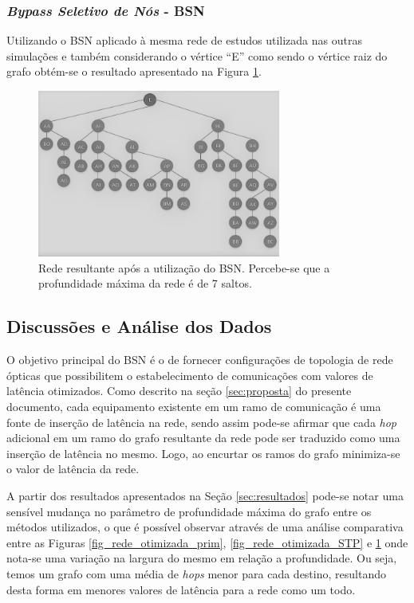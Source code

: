 \documentclass[12pt]{article}
\begin{document}
\subsubsection{\emph{Bypass Seletivo de Nós} - BSN}
Utilizando o BSN aplicado à mesma rede de estudos utilizada nas outras simulações e também considerando o vértice ``E'' como sendo o vértice raiz do grafo obtém-se o resultado apresentado na Figura \ref{fig_rede_otimizada_BSN}.

\begin{figure} %
	\centering
	\includegraphics[width=8cm]{Otimizada_BSN_PB}
	\caption{Rede resultante após a utilização do BSN. Percebe-se que a profundidade máxima da rede é de 7 saltos.}
	\label{fig_rede_otimizada_BSN}
\end{figure}



\subsection{Discussões e Análise dos Dados}

O objetivo principal do BSN é o de fornecer configurações de topologia de rede ópticas que possibilitem o estabelecimento de comunicações com valores de latência otimizados. Como descrito na seção \ref{sec:proposta} do presente documento, cada equipamento existente em um ramo de comunicação é uma fonte de inserção de latência na rede, sendo assim pode-se afirmar que cada \emph{hop} adicional em um ramo do grafo resultante da rede pode ser traduzido como uma inserção de latência no mesmo. Logo, ao encurtar os ramos do grafo minimiza-se o valor de latência da rede.

A partir dos resultados apresentados na Seção \ref{sec:resultados} pode-se notar uma sensível mudança no parâmetro de profundidade máxima do grafo entre os métodos utilizados, o que é possível observar através de uma análise comparativa entre as Figuras \ref{fig_rede_otimizada_prim}, \ref{fig_rede_otimizada_STP} e \ref{fig_rede_otimizada_BSN} onde nota-se uma variação na largura do mesmo em relação a profundidade. Ou seja, temos um grafo com uma média de \emph{hops} menor para cada destino, resultando desta forma em menores valores de latência para a rede como um todo.
\end{document}
